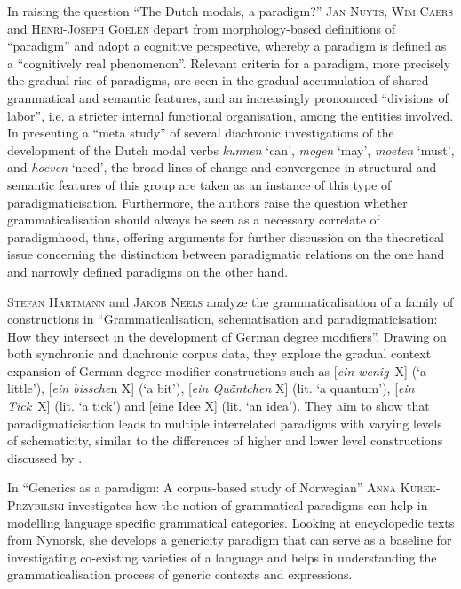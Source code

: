 \documentclass[output=paper]{langsci/langscibook}
\begin{document}
In raising the question “The Dutch modals, a paradigm?” \textsc{Jan Nuyts}, \textsc{Wim Caers} and \textsc{Henri-Joseph Goelen} depart from morphology-based definitions of “paradigm” and adopt a cognitive perspective, whereby a paradigm is defined as a “cognitively real phenomenon”. Relevant criteria for a paradigm, more precisely the gradual rise of paradigms, are seen in the gradual accumulation of shared grammatical and semantic features, and an increasingly pronounced “divisions of labor”, i.e. a stricter internal functional organisation, among the entities involved. In presenting a “meta study” of several diachronic investigations of the development of the Dutch modal verbs \textit{kunnen} ‘can’, \textit{mogen} ‘may’, \textit{moeten} ‘must’, and \textit{hoeven} ‘need’, the broad lines of change and convergence in structural and semantic features of this group are taken as an instance of this type of paradigmaticisation. Furthermore, the authors raise the question whether grammaticalisation should always be seen as a necessary correlate of paradigmhood, thus, offering arguments for further discussion on the theoretical issue concerning the distinction between paradigmatic relations on the one hand and narrowly defined paradigms on the other hand. 

\textsc{Stefan} \textsc{Hartmann} and \textsc{Jakob} \textsc{Neels} analyze the grammaticalisation of a family of constructions in “Grammaticalisation, schematisation and paradigmaticisation: How they intersect in the development of German degree modifiers”. Drawing on both synchronic and diachronic corpus data, they explore the gradual context expansion of German degree modifier-constructions such as [\textit{ein wenig}~X] (‘a little’), [\textit{ein bissche}n X] (‘a bit’), [\textit{ein Quäntchen} X] (lit. ‘a quantum’), [\textit{ein Tick}~X] (lit. ‘a tick’) and [eine Idee X] (lit. ‘an idea’). They aim to show that paradigmaticisation leads to multiple interrelated paradigms with varying levels of schematicity, similar to the differences of higher and lower level constructions discussed by \citet{Traugott2007}. 

\begin{sloppypar}
In “Generics as a paradigm: A corpus-based study of Norwegian” \textsc{Anna} \textsc{Kurek-Przybilski} investigates how the notion of grammatical paradigms can help in modelling language specific grammatical categories. Looking at encyclopedic texts from Nynorsk, she develops a genericity paradigm that can serve as a baseline for investigating co-existing varieties of a language and helps in understanding the grammaticalisation process of generic contexts and expressions. 
\end{sloppypar}
\end{document}
